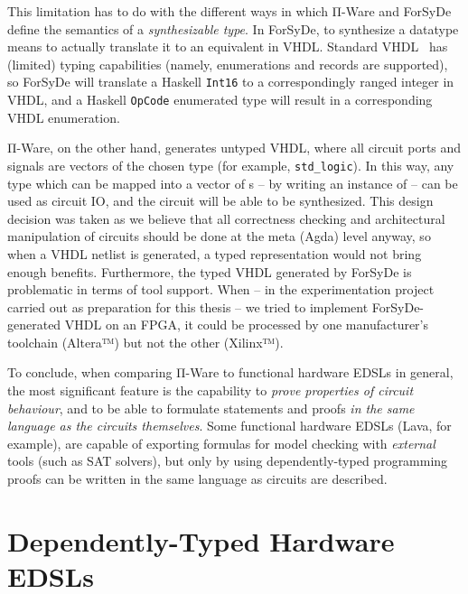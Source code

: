         This limitation has to do with the different ways in which Π-Ware and ForSyDe define
        the semantics of a \emph{synthesizable type}.
        In ForSyDe, to synthesize a datatype means to actually translate it to an equivalent in \ac{VHDL}.
        Standard \ac{VHDL}~\cite{vhdl-standard} has (limited) typing capabilities
        (namely, enumerations and records are supported), so ForSyDe will translate
        a Haskell \texttt{Int16} to a correspondingly ranged integer in VHDL,
        and a Haskell \texttt{OpCode} enumerated type will result in a corresponding
        \ac{VHDL} enumeration.

        Π-Ware, on the other hand, generates untyped \ac{VHDL}, where all circuit ports and signals
        are vectors of the chosen  type (for example, \texttt{std_logic}).
        In this way, any type which can be mapped into a vector of s – by writing an
        instance of  – can be used as circuit IO, and the circuit will be able to be synthesized.
        This design decision was taken as we believe that all correctness checking and architectural
        manipulation of circuits should be done at the meta (Agda) level anyway,
        so when a \ac{VHDL} netlist is generated, a typed representation would not bring enough benefits.
        Furthermore, the typed \ac{VHDL} generated by ForSyDe is problematic in terms of tool support.
        When – in the experimentation project~\cite{functional-hardware-survey} carried out as preparation
        for this thesis – we tried to implement ForSyDe-generated \ac{VHDL} on an \ac{FPGA},
        it could be processed by one manufacturer's toolchain (Altera™) but not the other (Xilinx™).

        To conclude, when comparing Π-Ware to functional hardware \acp{EDSL} in general,
        the most significant feature is the capability to \emph{prove properties of circuit behaviour},
        and to be able to formulate statements and proofs
        \emph{in the same language as the circuits themselves}.
        Some functional hardware \acp{EDSL} (Lava, for example), are capable of exporting formulas
        for model checking with \emph{external} tools (such as SAT solvers), but only by using
        dependently-typed programming proofs can be written in the same language as circuits are described.


    \section{Dependently-Typed Hardware \acp{EDSL}}

